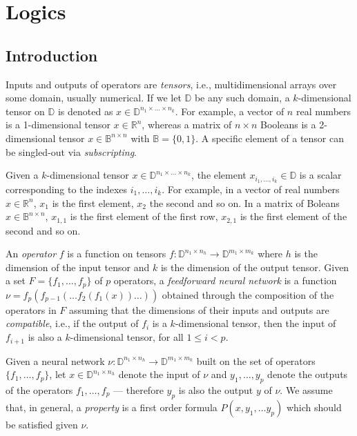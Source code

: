 
\chapter{Logics}
\label{sec:query_categories}

\section{Introduction}

Inputs and outputs of operators are \emph{tensors}, i.e.,
multidimensional arrays over some domain, usually numerical. 
If we let $\mathbb{D}$ be any such domain, a $k$-dimensional 
tensor on $\mathbb{D}$ is denoted as $x \in \mathbb{D}^{n_1 
	\times \ldots \times n_k}$.
For example, a vector of $n$ real numbers is a 1-dimensional
tensor $x \in \mathbb{R}^n$, whereas a matrix of $n \times n$ 
Booleans is a 2-dimensional tensor $x \in \mathbb{B}^{n 
	\times n}$ with $\mathbb{B} = \{0, 1\}$. A specific element 
of a tensor can be singled-out via \emph{subscripting}. 

Given a $k$-dimensional tensor $x \in \mathbb{D}^{n_1 \times 
	\ldots \times n_k}$, the element $x_{i_1, \ldots, i_k} \in 
	\mathbb{D}$ is a scalar corresponding to the indexes 
${i_1, \ldots, i_k}$. For example, in a vector of real numbers 
$x \in \mathbb{R}^n$, $x_1$ is the first element, $x_2$ the second 
and so on. In a matrix of Boleans $x \in \mathbb{B}^{n \times
  n}$, $x_{1,1}$ is the first element of the first row, $x_{2,1}$ 
is the first element of the second and so on.

An \emph{operator} $f$ is a function on tensors 
$f: \mathbb{D}^{n_{1} \times n_h} \to \mathbb{D}^{m_{1} \times m_k}$
where $h$ is the dimension of the input tensor and $k$ is the 
dimension of the output tensor. Given a set $F = \{f_1, \ldots, 
	f_p\}$ of $p$ operators, a \emph{feedforward neural network}
is a function $\nu = f_p(f_{p-1}(\ldots f_2(f_1(x))\ldots))$ obtained
through the composition of the operators in $F$ assuming that the 
dimensions of their inputs and outputs are \emph{compatible}, i.e.,
if the  output of $f_i$ is a $k$-dimensional tensor, then the input
of $f_{i+1}$ is also a $k$-dimensional tensor, for all $1 \leq i < p$.

Given a neural network $\nu : \mathbb{D}^{n_{1} \times n_h} \to
\mathbb{D}^{m_{1} \times m_k}$ built on the set of operators $\{f_1,
\ldots, f_p\}$, let $x \in \mathbb{D}^{n_{1} \times n_h}$ denote
the input of $\nu$ and $y_1, \ldots, y_p$ denote the outputs of the
operators $f_1, \ldots, f_p$ --- therefore $y_p$ is also the output
$y$ of $\nu$. We assume that, in general, a \emph{property} is a first
order formula $P(x, y_1, \ldots y_p)$ which should be satisfied given 
$\nu$.


